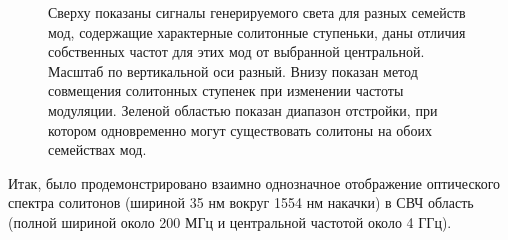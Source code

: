 \begin{figure}[!htb]
\begin{minipage}{1\linewidth}
\end{minipage}
\caption{Сверху показаны сигналы генерируемого света для разных семейств мод, содержащие характерные солитонные ступеньки, даны отличия собственных частот для этих мод от выбранной центральной. Масштаб по вертикальной оси разный. Внизу показан метод совмещения солитонных ступенек при изменении частоты модуляции. Зеленой областью показан диапазон отстройки, при котором одновременно могут существовать солитоны на обоих семействах мод.}
\label{Figure2}
\end{figure}


Итак, было продемонстрировано взаимно однозначное отображение оптического спектра солитонов (шириной 35 нм вокруг 1554 нм накачки) в СВЧ область (полной шириной около 200 МГц и центральной частотой около 4 ГГц).

